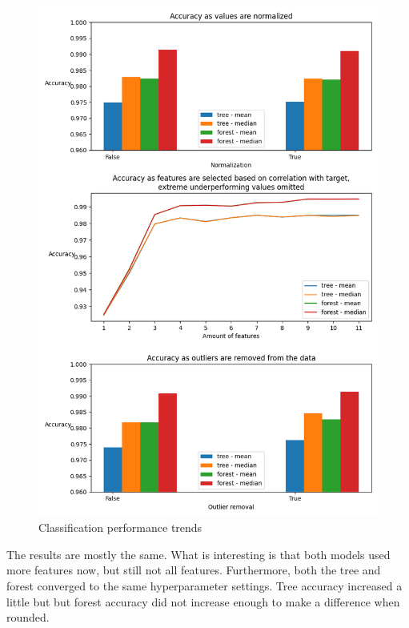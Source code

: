 \documentclass[12pt, letterpaper]{article}
\begin{document}
\begin{figure}[H]
    \centering
    \includegraphics[scale=0.7]{classification_performance_100.png}
    \caption{Classification performance trends}
    \label{cls_plt_100} %
\end{figure}

The results are mostly the same. What is interesting is that both models used more features now, but still not all features. Furthermore, both the tree and forest converged to the same hyperparameter settings. Tree accuracy increased a little but but forest accuracy did not increase enough to make a difference when rounded.
\end{document}
